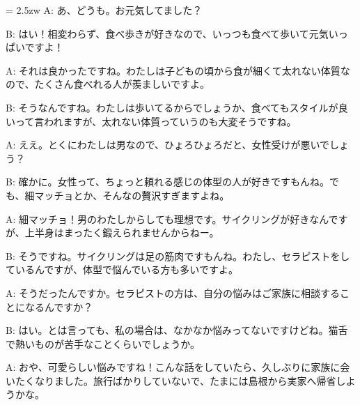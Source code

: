 \documentclass[11pt]{amsart}
\title{}
\author{}
\newenvironment{hangall}[1]{\hangindent = 2.5zw\everypar{\hangindent = 2.5zw}}{}
\begin{document}
\maketitle
\begin{hangall}{}%
A: あ、どうも。お元気してました？

B: はい！相変わらず、食べ歩きが好きなので、いっつも食べて歩いて元気いっぱいですよ！

A: それは良かったですね。わたしは子どもの頃から食が細くて太れない体質なので、たくさん食べれる人が羨ましいですよ。

B: そうなんですね。わたしは歩いてるからでしょうか、食べてもスタイルが良いって言われますが、太れない体質っていうのも大変そうですね。

A: ええ。とくにわたしは男なので、ひょろひょろだと、女性受けが悪いでしょう？

B: 確かに。女性って、ちょっと頼れる感じの体型の人が好きですもんね。でも、細マッチョとか、そんなの贅沢すぎますよね。

A: 細マッチョ！男のわたしからしても理想です。サイクリングが好きなんですが、上半身はまったく鍛えられませんからねー。

B: そうですね。サイクリングは足の筋肉ですもんね。わたし、セラピストをしているんですが、体型で悩んでいる方も多いですよ。

A: そうだったんですか。セラピストの方は、自分の悩みはご家族に相談することになるんですか？

B: はい。とは言っても、私の場合は、なかなか悩みってないですけどね。猫舌で熱いものが苦手なことくらいでしょうか。

A: おや、可愛らしい悩みですね！こんな話をしていたら、久しぶりに家族に会いたくなりました。旅行ばかりしていないで、たまには島根から実家へ帰省しようかな。
\end{hangall}
\end{document}
